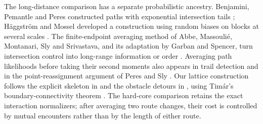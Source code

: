 The long-distance comparison has a separate probabilistic ancestry.
Benjamini, Pemantle and Peres constructed paths with exponential intersection
tails \citep{BPP1998}; H\"aggstr\"om and Mossel developed a construction using
random biases on blocks at several scales \citep{HaggstromMossel1998}.
The finite-endpoint averaging method of Abbe, Massouli\'e, Montanari, Sly and
Srivastava, and its adaptation by Garban and Spencer, turn intersection
control into long-range information or order
\citep{AbbeMassoulieMontanariSlySrivastava2018,GarbanSpencer2023}.
Averaging path likelihoods before taking their second moments also appears
in trail detection and in the point-reassignment argument of Peres and Sly
\citep{AriasCastroCandesHelgasonZeitouni2008,BergerPeres2013,PeresSly2014}.
Our lattice construction follows the explicit skeleton in \citet[Section~8.1]{B}
and the obstacle detours in \citet[Section~7]{HS}, using Tim\'ar's
boundary-connectivity theorem \citep[Theorem~4]{Timar2013}.
The hard-core comparison retains the exact interaction normalizers; after
averaging two route changes, their cost is controlled by mutual encounters
rather than by the length of either route.
